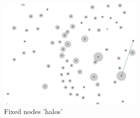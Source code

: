 \begin{figure}[h!]
  \begin{center}
  \includegraphics[trim={0, 0, 0, 0}, width=70mm]{./Figures/greyCircles.png}
  \caption{Fixed nodes 'halos'}
  \label{fig:greyCircles}
  \end{center}
\end{figure}









